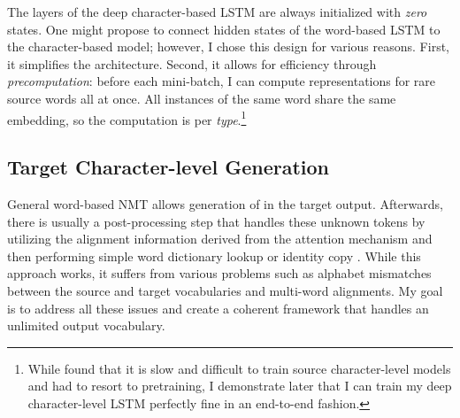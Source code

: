 The layers of the deep character-based LSTM are always initialized with {\it
zero} states. One might propose to connect hidden
states of the word-based LSTM to the character-based model; however, I chose this design
for various reasons. First, it simplifies the architecture. Second, it allows
for efficiency through {\it precomputation}: before each mini-batch, I can compute
representations for rare source words all at once. All instances of the same
word share the same embedding, so the computation is per {\it type}.\footnote{While  found that it is slow and difficult to train
source character-level models and had to resort to pretraining, I demonstrate
later that I can train my deep character-level LSTM %
perfectly fine in an end-to-end fashion.} 




\subsection{Target Character-level Generation}
\label{subsec:tgt}
General word-based NMT allows generation of \unk{} in the target output.
Afterwards, there is usually a post-processing step that handles
these unknown tokens by utilizing the
alignment information derived from the attention mechanism and then performing
simple word dictionary lookup or identity copy \cite{luong15attn,jean15}. 
While this approach works, it suffers from various problems such as alphabet
mismatches between the source and target vocabularies and multi-word
alignments.
My goal is to address all
these issues and create a
coherent framework that handles an unlimited output vocabulary.

